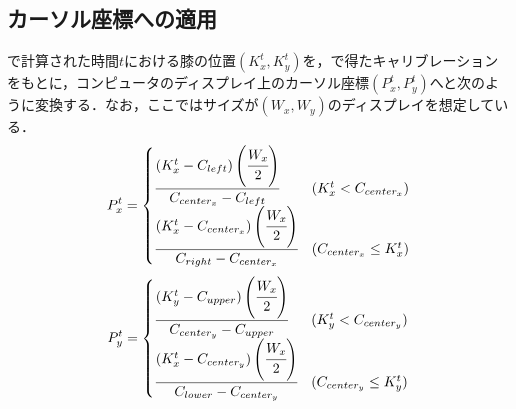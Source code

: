 \subsection{カーソル座標への適用}
で計算された時間$t$における膝の位置$(K^t_x, K^t_y)$を，で得たキャリブレーションをもとに，コンピュータのディスプレイ上のカーソル座標$(P^t_x, P^t_y)$へと次のように変換する．なお，ここではサイズが$(W_x, W_y)$のディスプレイを想定している．
\begin{eqnarray}
	P^t_x = 
	\begin{cases}
		\cfrac{(K^t_x - C_{left}) \left( \cfrac{W_x}{2} \right)}{C_{center_x} - C_{left}} & (K^t_x < C_{center_x})\\
		\cfrac{(K^t_x - C_{center_x}) \left( \cfrac{W_x}{2} \right)}{C_{right} - C_{center_x}} & (C_{center_x} \leq K^t_x)
	\end{cases}	 
\end{eqnarray}
\begin{eqnarray}
	P^t_y = 
	\begin{cases}
		\cfrac{(K^t_y - C_{upper}) \left( \cfrac{W_x}{2} \right)}{C_{center_y} - C_{upper}} & (K^t_y < C_{center_y}) \\
		\cfrac{(K^t_x - C_{center_y}) \left( \cfrac{W_x}{2} \right)}{C_{lower} - C_{center_y}} & (C_{center_y} \leq K^t_y)
	\end{cases}
\end{eqnarray}



